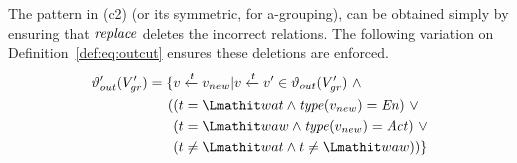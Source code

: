 The pattern in (c2) (or its symmetric, for a-grouping), can be obtained simply by ensuring that $\mathit{replace}$ deletes the incorrect relations.
%
The following variation on Definition~\ref{def:eq:outcut} ensures these deletions are enforced.
\begin{align*}
\vartheta_{out}'(V_{gr}') = \{ & v \xleftarrow{t}  v_{new} |  v \xleftarrow{t} v' \in \vartheta_{out}(V_{gr}') ~\wedge \\
      ( & (t = \wat \wedge \type(v_{new}) = \en) ~\vee \\
        & (t = \waw \wedge \type(v_{new}) = \act)  ~\vee \\
        & (t \neq \wat \wedge t \neq \waw) )\} 
\end{align*}


%
%
% 
%
%
%
% 
%
%
%
% 
